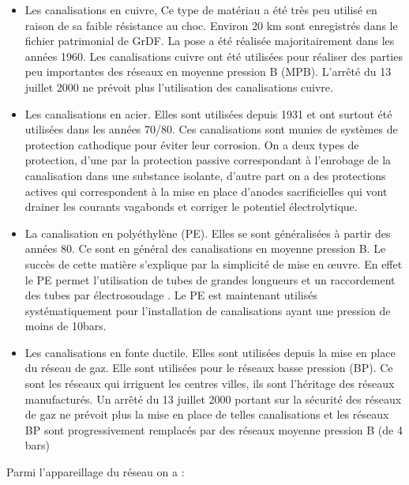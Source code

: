 \documentclass[
12pt,
french,                           %
a4paper,
]{article}
\begin{document}
\begin{itemize}
\item
  Les canalisations en cuivre, Ce type de matériau a été très peu
  utilisé en raison de sa faible résistance au choc. Environ 20 km sont
  enregistrés dans le fichier patrimonial de GrDF. La pose a été
  réalisée majoritairement dans les années 1960. Les canalisations
  cuivre ont été utilisées pour réaliser des parties peu importantes des
  réseaux en moyenne pression B (MPB). L'arrêté du 13 juillet 2000 ne
  prévoit plus l'utilisation des canalisations cuivre.
\item
  Les canalisations en acier. Elles sont utilisées depuis 1931 et ont
  surtout été utilisées dans les années 70/80. Ces canalisations sont
  munies de systèmes de protection cathodique pour éviter leur
  corrosion. On a deux types de protection, d'une par la protection
  passive correspondant à l'enrobage de la canalisation dans une
  substance isolante, d'autre part on a des protections actives qui
  correspondent à la mise en place d'anodes sacrificielles qui vont
  drainer les courants vagabonds et corriger le potentiel
  électrolytique.
\item
  La canalisation en polyéthylène (PE). Elles se sont généralisées à
  partir des années 80. Ce sont en général des canalisations en moyenne
  pression B. Le succès de cette matière s'explique par la simplicité de
  mise en œuvre. En effet le PE permet l'utilisation de tubes de grandes
  longueurs et un raccordement des tubes par électrosoudage . Le PE est
  maintenant utilisés systématiquement pour l'installation de
  canalisations ayant une pression de moins de 10bars.
\item
  Les canalisations en fonte ductile. Elles sont utilisées depuis la
  mise en place du réseau de gaz. Elle sont utilisées pour le réseaux
  basse pression (BP). Ce sont les réseaux qui irriguent les centres
  villes, ils sont l'héritage des réseaux manufacturés. Un arrêté du 13
  juillet 2000 portant sur la sécurité des réseaux de gaz ne prévoit
  plus la mise en place de telles canalisations et les réseaux BP sont
  progressivement remplacés par des réseaux moyenne pression B (de 4
  bars)
\end{itemize}

Parmi l'appareillage du réseau on a :
\end{document}
